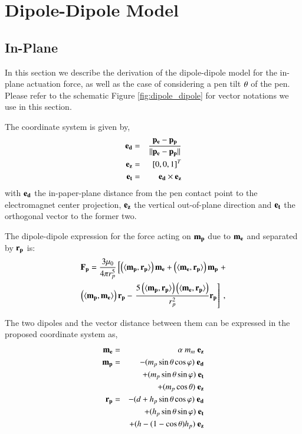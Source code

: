 \section{Dipole-Dipole Model}
\subsection{In-Plane}
    In this section we describe the derivation of the dipole-dipole model for the in-plane actuation force, as well as the case of considering a pen tilt $\theta$ of the pen. Please refer to the schematic Figure \ref{fig:dipole_dipole} for vector notations we use in this section. 
    
    The coordinate system is given by,
    \begin{eqnarray}
     \mathbf{e_d} &=& \frac{\mathbf{p_e} - \mathbf{p_p}}{||\mathbf{p_e} - \mathbf{p_p}||} \\
     \mathbf{e_z} &=& [0,0,1]^T \\
     \mathbf{e_t} &=& \mathbf{e_d} \times \mathbf{e_z}
    \end{eqnarray}
    \noindent with $\mathbf{e_d}$ the in-paper-plane distance from the pen contact point to the electromagnet center projection, $\mathbf{e_z}$ the vertical out-of-plane direction and $\mathbf{e_t}$ the orthogonal vector to the former two.
    
    The dipole-dipole expression for the force acting on $\mathbf{m_p}$ due to $\mathbf{m_e}$ and separated by $\mathbf{r_{p}}$ is:
    \begin{multline}
       \mathbf{F_p} = {\dfrac  {3\mu _{0}}{4\pi r_{p}^{5}}}
       \left [ \left(\langle\mathbf{m_p},\mathbf{r_{p}}\rangle \right) \mathbf{m_e} + 
       \left(\langle\mathbf{m_e},\mathbf{r_{p}}\rangle\right) \mathbf{m_p} \right . +
       \\
       \left(\langle\mathbf{m_p},\mathbf{m_e}\rangle\right) \mathbf{r_{p}} - 
        \left . {\dfrac{5\left(\langle\mathbf{m_p},\mathbf{r_{p}}\rangle\right)
        \left(\langle\mathbf{m_e},\mathbf{r_{p}}\rangle\right)}{r_{p}^{2}}} \mathbf{r_{p}} \right ] \ , \label{eq:ap.F21-dip}
    \end{multline}
    
    The two dipoles and the vector distance between them can be expressed in the proposed coordinate system as,
    \begin{eqnarray}
     \mathbf{m_e} &=& \alpha \ m_m \ \mathbf{e_z} \label{ap.mm}\\
     \mathbf{m_p} &=& - (m_p \sin{\theta} \cos{\varphi}) \ \mathbf{e_d} \nonumber \\
              && + (m_p \sin{\theta} \sin{\varphi}) \ \mathbf{e_t} \nonumber \\
              && + (m_p \cos{\theta}) \ \mathbf{e_z} \label{ap.mp} \\
     \mathbf{r_{p}} &=& - (d+h_p \sin{\theta} \cos{\varphi}) \ \mathbf{e_d} \nonumber \\
              && + (h_p \sin{\theta} \sin{\varphi}) \ \mathbf{e_t} \nonumber \\
              && + (h - (1-\cos{\theta}) h_p) \ \mathbf{e_z} \label{ap.rmp}
    \end{eqnarray}
    
